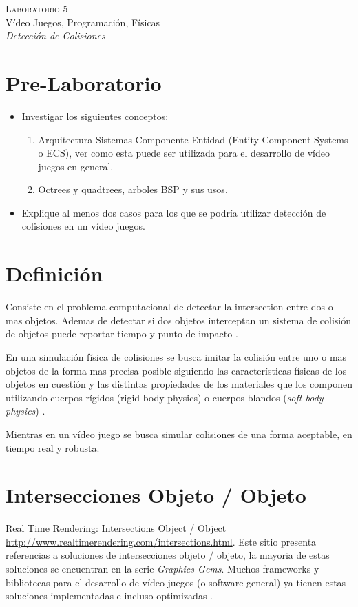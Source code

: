 \begin{center}
\textsc{\Large Laboratorio 5}~\\
{\large Vídeo Juegos, Programación, Físicas}~\\
\emph{Detección de Colisiones}
\end{center}


\section{Pre-Laboratorio}
\begin{itemize}
\item Investigar los siguientes conceptos:
\begin{enumerate}
  \item Arquitectura Sistemas-Componente-Entidad (Entity Component Systems o ECS), ver como esta puede ser utilizada para el desarrollo de vídeo juegos en general.
  \item Octrees y quadtrees, arboles BSP y sus usos.
\end{enumerate}
\item Explique al menos dos casos para los que se podría utilizar detección de colisiones en un vídeo juegos.
\end{itemize}

\section{Definición}
Consiste en el problema computacional de detectar la intersection entre dos o mas objetos. Ademas de detectar si dos objetos interceptan un sistema de colisión de objetos puede reportar tiempo y punto de impacto \cite{ericson_collision}.

En una simulación física de colisiones se busca imitar la colisión entre uno o mas objetos de la forma mas precisa posible siguiendo las características físicas de los objetos en cuestión y las distintas propiedades de los materiales que los componen utilizando cuerpos rígidos (rigid-body physics) o cuerpos blandos (\emph{soft-body physics}) \cite[p.~340]{jenkinscreatinggames}.

Mientras en un vídeo juego se busca simular colisiones de una forma aceptable, en tiempo real y robusta.

\section{Intersecciones Objeto / Objeto}
Real Time Rendering: Intersections Object / Object \url{http://www.realtimerendering.com/intersections.html}. Este sitio presenta referencias a soluciones de intersecciones objeto / objeto, la mayoria de estas soluciones se encuentran en la serie \emph{Graphics Gems}. Muchos frameworks y bibliotecas para el desarrollo de vídeo juegos (o software general) ya tienen estas soluciones implementadas e incluso optimizadas \cite{rtr_intersections}.
